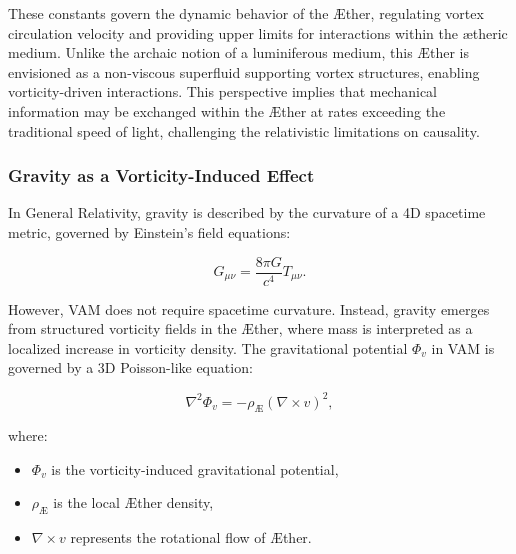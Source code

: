 \documentclass[a4paper,10pt]{article}
\begin{document}
These constants govern the dynamic behavior of the Æther, regulating vortex circulation velocity and providing upper limits for interactions within the ætheric medium.
Unlike the archaic notion of a luminiferous medium, this Æther is envisioned as a non-viscous superfluid supporting vortex structures, enabling vorticity-driven interactions.
This perspective implies that mechanical information may be exchanged within the Æther at rates exceeding the traditional speed of light, challenging the relativistic limitations on causality.


    \subsubsection*{Gravity as a Vorticity-Induced Effect}

    In General Relativity, gravity is described by the curvature of a 4D spacetime metric, governed by Einstein's field equations:

    \begin{equation*}
        G_{\mu\nu} = \frac{8\pi G}{c^4} T_{\mu\nu}.
    \end{equation*}

    However, VAM does not require spacetime curvature. Instead, gravity emerges from structured vorticity fields in the Æther, where mass is interpreted as a localized increase in vorticity density. The gravitational potential \( \Phi_v \) in VAM is governed by a 3D Poisson-like equation:

    \begin{equation*}
        \nabla^2 \Phi_v = -\rho_\text{Æ} (\nabla \times v)^2,
    \end{equation*}

    where:
    \begin{itemize}
        \item \( \Phi_v \) is the vorticity-induced gravitational potential,
        \item \( \rho_\text{Æ} \) is the local Æther density,
        \item \( \nabla \times v \) represents the rotational flow of Æther.
    \end{itemize}


\begin{table}[h]
    \centering
    \caption{Comparison between General Relativity and VAM}
    \label{tab:GR_vs_VAM}
\end{table}
\end{document}
